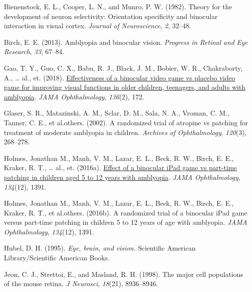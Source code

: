 \documentclass[
  onecolumn]{article}
\newlength{\cslhangindent}
\newenvironment{CSLReferences}[2] %
 {%
  \setlength{\parindent}{0pt}
  \ifodd #1 \everypar{\setlength{\hangindent}{\cslhangindent}}\ignorespaces\fi
  \ifnum #2 > 0
  \setlength{\parskip}{#2\baselineskip}
  \fi
 }%
 {}
\begin{document}
\hypertarget{refs}{}
\begin{CSLReferences}{1}{0}
\leavevmode{}%
Bienenstock, E. L., Cooper, L. N., and Munro, P. W. (1982). Theory for
the development of neuron selectivity: Orientation specificity and
binocular interaction in visual cortex. \emph{Journal of Neuroscience},
\emph{2}, 32--48.

\leavevmode{}%
Birch, E. E. (2013). Amblyopia and binocular vision. \emph{Progress in
Retinal and Eye Research}, \emph{33}, 67--84.

\leavevmode{}%
Gao, T. Y., Guo, C. X., Babu, R. J., Black, J. M., Bobier, W. R.,
Chakraborty, A., \ldots{} al., et. (2018).
\href{https://doi.org/10.1001/jamaophthalmol.2017.6090}{Effectiveness of
a binocular video game vs placebo video game for improving visual
functions in older children, teenagers, and adults with amblyopia}.
\emph{JAMA Ophthalmology}, \emph{136}(2), 172.

\leavevmode{}%
Glaser, S. R., Matazinski, A. M., Sclar, D. M., Sala, N. A., Vroman, C.
M., Tanner, C. E., et al.others. (2002). A randomized trial of atropine
vs patching for treatment of moderate amblyopia in children.
\emph{Archives of Ophthalmology}, \emph{120}(3), 268--278.

\leavevmode{}%
Holmes, Jonathan M., Manh, V. M., Lazar, E. L., Beck, R. W., Birch, E.
E., Kraker, R. T., \ldots{} al., et. (2016a).
\href{https://doi.org/10.1001/jamaophthalmol.2016.4262}{Effect of a
binocular iPad game vs part-time patching in children aged 5 to 12 years
with amblyopia}. \emph{JAMA Ophthalmology}, \emph{134}(12), 1391.

\leavevmode{}%
Holmes, Jonathan M., Manh, V. M., Lazar, E. L., Beck, R. W., Birch, E.
E., Kraker, R. T., et al.others. (2016b). A randomized trial of a
binocular iPad game versus part-time patching in children 5 to 12 years
of age with amblyopia. \emph{JAMA Ophthalmology}, \emph{134}(12), 1391.

\leavevmode{}%
Hubel, D. H. (1995). \emph{Eye, brain, and vision.} Scientific American
Library/Scientific American Books.

\leavevmode{}%
Jeon, C. J., Strettoi, E., and Masland, R. H. (1998). {The major cell
populations of the mouse retina}. \emph{J Neurosci}, \emph{18}(21),
8936--8946.


\end{CSLReferences}
\end{document}
